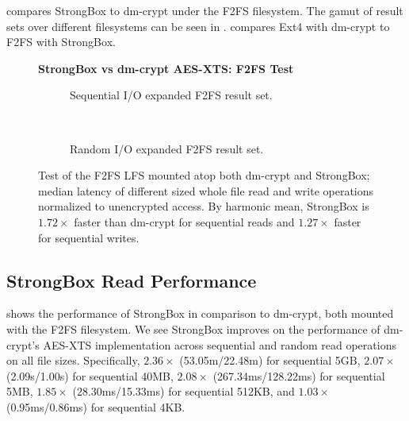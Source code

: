 compares StrongBox to dm-crypt under the F2FS
filesystem. The gamut of result sets over different filesystems can
be seen in . 
compares Ext4 with dm-crypt to F2FS with StrongBox.

\begin{figure}[ht]
    \textbf{StrongBox vs dm-crypt AES-XTS: F2FS Test}\par\medskip
    \begin{subfigure}{\linewidth}
        \centering
        {}
        \caption{Sequential I/O expanded F2FS result set.}\label{fig:microbench-f2fs-sequential}
    \end{subfigure}\\[1ex]
    \begin{subfigure}{\linewidth}
        \centering
        {}
        \caption{Random I/O expanded F2FS result set.}\label{fig:microbench-f2fs-random}
    \end{subfigure}
    \caption{Test of the F2FS LFS mounted atop both dm-crypt and
      StrongBox; median latency of different sized whole file read and
      write operations normalized to unencrypted access. By harmonic
      mean, StrongBox is $1.72\times$ faster than dm-crypt for sequential reads
      and $1.27\times$ faster for sequential writes.}\label{fig:microbench-f2fs}
\end{figure}

\subsection{StrongBox Read Performance}

 shows the performance of StrongBox in comparison to
dm-crypt, both mounted with the F2FS filesystem. We see StrongBox improves on
the performance of dm-crypt's AES-XTS implementation across sequential and
random read operations on all file sizes. Specifically, $2.36\times$
(53.05m/22.48m) for sequential 5GB, $2.07\times$ (2.09s/1.00s) for sequential
40MB, $2.08\times$ (267.34ms/128.22ms) for sequential 5MB, $1.85\times$
(28.30ms/15.33ms) for sequential 512KB, and $1.03\times$ (0.95ms/0.86ms) for
sequential 4KB\@.

